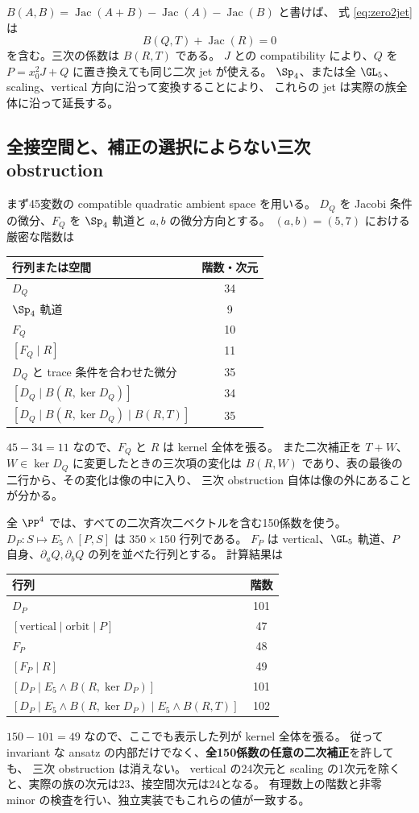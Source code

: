 $B(A,B)=\operatorname{Jac}(A+B)-\operatorname{Jac}(A)-\operatorname{Jac}(B)$ と書けば、
式 \eqref{eq:zero2jet} は
\[
 B(Q,T)+\operatorname{Jac}(R)=0
\]
を含む。三次の係数は $B(R,T)$ である。
$J$ との compatibility により、$Q$ を $P=x_0^2J+Q$ に置き換えても同じ二次 jet が使える。
$\Sp_4$、または全 $\GL_5$、scaling、vertical 方向に沿って変換することにより、
これらの jet は実際の族全体に沿って延長する。

\subsection{全接空間と、補正の選択によらない三次 obstruction}
まず45変数の compatible quadratic ambient space を用いる。
$D_Q$ を Jacobi 条件の微分、$F_Q$ を $\Sp_4$ 軌道と $a,b$ の微分方向とする。
$(a,b)=(5,7)$ における厳密な階数は
\begin{center}\small
\begin{tabular}{lc}
\toprule
行列または空間 & 階数・次元\\
\midrule
$D_Q$ &34\\
$\Sp_4$ 軌道 &9\\
$F_Q$ &10\\
$[F_Q\mid R]$ &11\\
$D_Q$ と trace 条件を合わせた微分 &35\\
$[D_Q\mid B(R,\ker D_Q)]$ &34\\
$[D_Q\mid B(R,\ker D_Q)\mid B(R,T)]$ &35\\
\bottomrule
\end{tabular}
\end{center}
$45-34=11$ なので、$F_Q$ と $R$ は kernel 全体を張る。
また二次補正を $T+W$、$W\in\ker D_Q$ に変更したときの三次項の変化は
$B(R,W)$ であり、表の最後の二行から、その変化は像の中に入り、
三次 obstruction 自体は像の外にあることが分かる。

全 $\PP^4$ では、すべての二次斉次二ベクトルを含む150係数を使う。
$D_P:S\mapsto E_5\wedge[P,S]$ は $350\times150$ 行列である。
$F_P$ は vertical、$\GL_5$ 軌道、$P$ 自身、$\partial_aQ,\partial_bQ$ の列を並べた行列とする。
計算結果は
\begin{center}\small
\begin{tabular}{lc}
\toprule
行列 & 階数\\
\midrule
$D_P$ &101\\
$[\mathrm{vertical}\mid\mathrm{orbit}\mid P]$ &47\\
$F_P$ &48\\
$[F_P\mid R]$ &49\\
$[D_P\mid E_5\wedge B(R,\ker D_P)]$ &101\\
$[D_P\mid E_5\wedge B(R,\ker D_P)\mid E_5\wedge B(R,T)]$ &102\\
\bottomrule
\end{tabular}
\end{center}
$150-101=49$ なので、ここでも表示した列が kernel 全体を張る。
従って invariant な ansatz の内部だけでなく、\textbf{全150係数の任意の二次補正}を許しても、
三次 obstruction は消えない。
vertical の24次元と scaling の1次元を除くと、実際の族の次元は23、接空間次元は24となる。
有理数上の階数と非零 minor の検査を行い、独立実装でもこれらの値が一致する。

